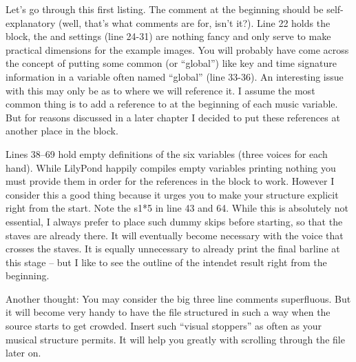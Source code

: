\documentclass[../../LilyPond-Tutorials]{subfiles}
\begin{document}

Let's go through this first listing. 
The comment at the beginning should be self-explanatory (well, that's what comments are for, isn't it?). 
Line 22 holds the  block, the  and  settings (line 24-31) are nothing fancy and only serve to make practical dimensions for the example images.
You will probably have come across the concept of putting some common (or “global”) like key and time signature information in a variable often named “global” (line 33-36). 
An interesting issue with this may only be as to where we will reference it. 
I assume the most common thing is to add a reference to  at the beginning of each music variable. 
But for reasons discussed in a later chapter I decided to put these references at another place in the  block.

Lines 38--69 hold empty definitions of the six variables (three voices for each hand). 
While LilyPond happily compiles empty variables printing nothing you must provide them in order for the references in the  block to work.
However I consider this a good thing because it urges you to make your structure explicit right from the start.
Note the s1*5 in line 43 and 64. 
While this is absolutely not essential, I always prefer to place such dummy skips before starting, so that the staves are already there. 
It will eventually become necessary with the voice that crosses the staves. 
It is equally unnecessary to already print the final barline at this stage – but I like to see the outline of the intendet result right from the beginning.

Another thought: You may consider the big three line comments superfluous. 
But it will become very handy to have the file structured in such a way when the source starts to get crowded. 
Insert such “visual stoppers” as often as your musical structure permits. 
It will help you greatly with scrolling through the file later on.
\end{document}
